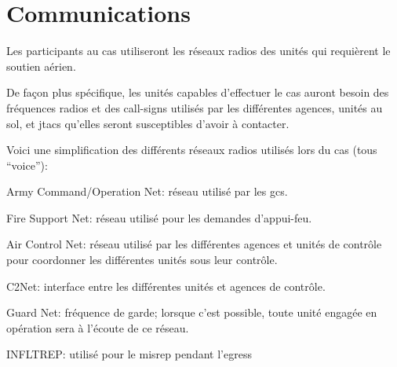 \section{Communications}

\e
    \item Les participants au \gls{cas} utiliseront les réseaux radios des unités qui requièrent le soutien aérien.
    \item
    De façon plus spécifique, les unités capables d'effectuer le \gls{cas} auront besoin des fréquences radios et des call-signs utilisés par les différentes agences, unités au sol, et \glspl{jtac} qu'elles seront susceptibles d'avoir à contacter.
    \item Voici une simplification des différents réseaux radios utilisés lors du \gls{cas} (tous ``voice''):
    \ee
        \item Army Command/Operation Net: réseau utilisé par les \glspl{gc}.
        \item Fire Support Net: réseau utilisé pour les demandes d'appui-feu.
        \item Air Control Net: réseau utilisé par les différentes agences et unités de contrôle pour coordonner les différentes unités sous leur contrôle.
        \item C2Net: interface entre les différentes unités et agences de contrôle.
        \item Guard Net: fréquence de garde; lorsque c'est possible, toute unité engagée en opération sera à l'écoute de ce réseau.
        \item INFLTREP: utilisé pour le \gls{misrep} pendant l'egress
    \ed
\ed
